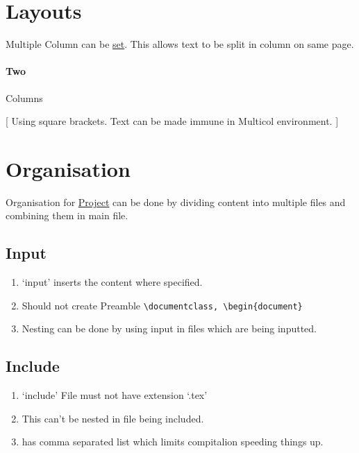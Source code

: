 \documentclass{report}[a4paper,12pt] %
\begin{document}
\section{Layouts}
Multiple Column can be \href{https://www.overleaf.com/learn/latex/Multiple_columns}{set}. This allows text to be split in column on same page.

\paragraph{Two} Columns
\begin{multicols}{2}
  \setlength{\columnseprule}{1pt}
  \def\columnseprulecolor{\color{blue}}

  [
  Using square brackets. Text can be made immune in Multicol environment.
  ]
  \lipsum[2]
\end{multicols}

\section{Organisation}
Organisation for \href{https://www.overleaf.com/learn/latex/Management_in_a_large_project}{Project} can be done by dividing content into multiple files
and combining them in main file.

\subsection{Input}
\begin{enumerate}
  \item `input' inserts the content where specified.
  \item Should not create Preamble \verb|\documentclass, \begin{document}|
  \item Nesting can be done by using input in files which are being inputted.
\end{enumerate}

\subsection{Include}
\begin{enumerate}
  \item `include' File must not have extension `.tex'
  \item This can't be nested in file being included.
  \item \verb|| has comma separated list which limits compitalion speeding things up.
\end{enumerate}
\end{document}
